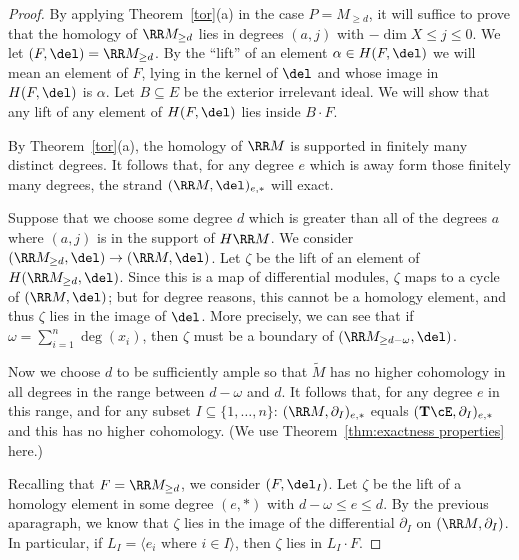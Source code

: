 \documentclass[12pt]{amsart}
\theoremstyle{definition}
\theoremstyle{remark}
\newcommand{\Tate}{{\mathbf{T}}}
\newcommand{\Pic}{\operatorname{Pic}}
\begin{document}
\begin{proof}
By applying Theorem~\ref{tor}(a) in the case $P=M_{\geq d}$, it will suffice to prove that the homology of $\RR M_{\geq d}$ lies in degrees $(a,j)$ with $-\dim X \leq j \leq 0$.    We let $(F,\del) = \RR M_{\geq d}$.  By the ``lift'' of an element $\alpha \in H(F,\del)$ we will mean an element of $F$, lying in the kernel of $\del$ and whose image in $H(F,\del)$ is $\alpha$.  Let $B\subseteq E$ be the exterior irrelevant ideal.  We will show that any lift of any element of $H(F,\del)$ lies inside $B\cdot F$.  

By Theorem~\ref{tor}(a), the homology of $\RR M$ is supported in finitely many distinct degrees.
 It follows that, for any degree $e$ which is away form those finitely many degrees, the strand $(\RR M,\del)_{e,*}$ will exact.

Suppose that we choose some degree $d$ which is greater than all of the degrees $a$ where $(a,j)$ is in the support of $H\RR M$.  We consider $(\RR M_{\geq d}, \del)\to (\RR M,\del)$.  Let $\zeta$ be the lift of an element of $H (\RR M_{\geq d}, \del)$.  Since this is a map of differential modules, $\zeta$ maps to a cycle of $(\RR M,\del)$; but for degree reasons, this cannot be a homology element, and thus $\zeta$ lies in the image of $\del$.   More precisely, we can see that if $\omega=\sum_{i=1}^n \deg(x_i)$, then $\zeta$ must be a boundary of $(\RR M_{\geq d - \omega},\del)$.  

Now we choose $d$ to be sufficiently ample so that $\widetilde{M}$ has no higher cohomology in all degrees in the range between $d-\omega$ and $d$.  It follows that, for any degree $e$ in this range, and for any subset $I\subseteq \{1,\dots,n\}$: $(\RR M, \partial_I)_{e,*}$ equals $(\Tate \cE,\partial_I)_{e,*}$ and this has no higher cohomology.  (We use Theorem~\ref{thm:exactness properties} here.)

Recalling that $F=\RR M_{\geq d}$, we consider $(F, \del_I)$.  
Let $\zeta$ be the lift of a homology element in some degree $(e,*)$ with $d-\omega \leq e \leq d$.  By the previous aparagraph, we know that $\zeta$ lies in the image of the differential $\partial_I$ on $(\RR M, \partial_I)$.  In particular, if $L_I = \langle e_i \text{ where } i\in I\rangle$, then $\zeta$ lies in $L_I \cdot F$.


\end{proof}
\end{document}

